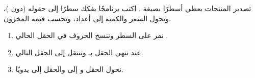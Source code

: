 \begin{statement}
تصدير المنتجات يعطي أسطرًا بصيغة . اكتب برنامجًا يفكك سطرًا إلى حقوله (دون )، ويحول السعر والكمية إلى أعداد، ويحسب قيمة المخزون.
\end{statement}
\begin{stepsbox}\begin{enumerate}
\item نمر على السطر وننسخ الحروف في الحقل الحالي .
\item عند \code{;} ننهي الحقل بـ  وننتقل إلى الحقل التالي.
\item نحول الحقل  و إلى  والحقل  إلى  يدويًا.
\end{enumerate}\end{stepsbox}
